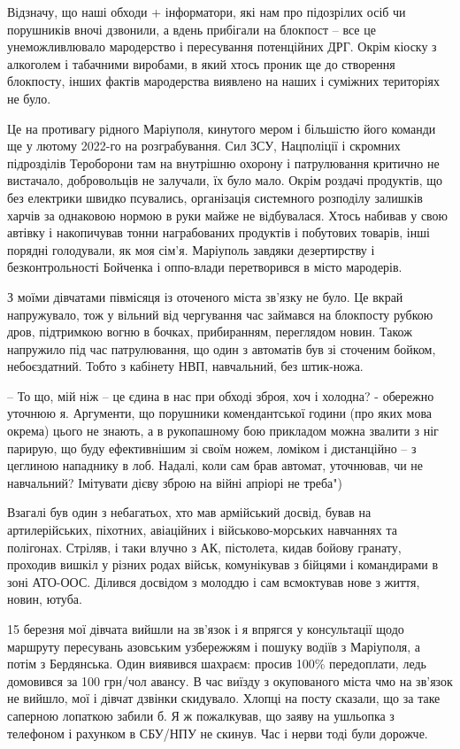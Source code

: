 Відзначу, що наші обходи + інформатори, які нам про підозрілих осіб чи
порушників вночі дзвонили, а вдень прибігали на блокпост – все це
унеможливлювало мародерство і пересування потенційних ДРГ. Окрім кіоску з
алкоголем і табачними виробами, в який хтось проник ще до створення блокпосту,
інших фактів мародерства виявлено на наших і суміжних територіях не було. 

Це на противагу рідного Маріуполя, кинутого мером і більшістю його команди ще у
лютому 2022-го на розграбування. Сил ЗСУ, Нацполіції і скромних підрозділів
Тероборони там на внутрішню охорону і патрулювання критично не вистачало,
добровольців не залучали, їх було мало. Окрім роздачі продуктів, що без
електрики швидко псувались, організація системного розподілу залишків харчів за
однаковою нормою в руки майже не відбувалася. Хтось набивав у свою автівку і
накопичував тонни награбованих продуктів і побутових товарів, інші порядні
голодували, як моя сім'я. Маріуполь завдяки дезертирству і безконтрольності
Бойченка і оппо-влади перетворився в місто мародерів.

З моїми дівчатами півмісяця із оточеного міста зв'язку не було. Це вкрай
напружувало, тож у вільний від чергування час займався на блокпосту рубкою
дров, підтримкою вогню в бочках, прибиранням, переглядом новин. Також напружило
під час патрулювання, що один з автоматів був зі сточеним бойком, небоєздатний.
Тобто з кабінету НВП, навчальний, без штик-ножа.

– То що, мій ніж – це єдина в нас при обході зброя, хоч і холодна? - обережно
уточнюю я. Аргументи, що порушники комендантської години (про яких мова окрема)
цього не знають, а в рукопашному бою прикладом можна звалити з ніг парирую, що
буду ефективнішим зі своїм ножем, ломіком і дистанційно – з цеглиною нападнику
в лоб. Надалі, коли сам брав автомат, уточнював, чи не навчальний? Імітувати
дієву зброю на війні апріорі не треба")

Взагалі був один з небагатьох, хто мав армійський досвід, бував на
артилерійських, піхотних, авіаційних і військово-морських навчаннях та
полігонах. Стріляв, і таки влучно з АК, пістолета, кидав бойову гранату,
проходив вишкіл у різних родах військ, комунікував з бійцями і командирами в
зоні АТО-ООС. Ділився досвідом з молоддю і сам всмоктував нове з життя, новин,
ютуба.

15 березня мої дівчата вийшли на зв'язок і я впрягся у консультації щодо
маршруту пересувань азовським узбережжям і пошуку водіїв з Маріуполя, а потім з
Бердянська. Один виявився шахраєм: просив 100\% передоплати, ледь домовився за
100 грн/чол авансу. В час виїзду з окупованого міста чмо на зв'язок не вийшло,
мої і дівчат дзвінки скидувало. Хлопці на посту сказали, що за таке саперною
лопаткою забили б. Я ж пожалкував, що заяву на ушльопка з телефоном і рахунком
в СБУ/НПУ не скинув. Час і нерви тоді були дорожче.

